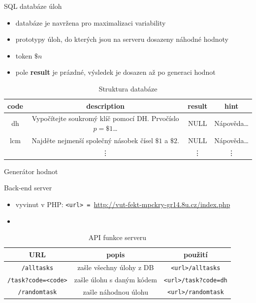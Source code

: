 \documentclass[aspectratio=1610]{beamer}
\begin{document}
\begin{frame}{SQL databáze úloh}
    \begin{itemize}
        \item databáze je navržena pro maximalizaci variability
        \item prototypy úloh, do kterých jsou na serveru dosazeny náhodné hodnoty
        \item token \textbf{$\$n$}
        \item pole \textbf{result} je prázdné, výsledek je dosazen až po generaci hodnot
    \end{itemize}
    \begin{table}
        \caption{Struktura databáze}
        \begin{tabular}[pos]{|c|c|c|c|}
            \hline
            \textbf{code} & \textbf{description} & \textbf{result} & \textbf{hint} \\
            \hline
            \hline
            dh & Vypočítejte soukromý klíč pomocí DH. Prvočíslo $p=\$1$\dots & NULL & Nápověda\dots \\
            \hline
            lcm & Najděte nejmenší společný násobek čísel $\$1$ a $\$2$. & NULL & Nápověda\dots \\
            \hline
            \smash{\vdots} & \vdots & \vdots & \vdots \\
            \hline
        \end{tabular}
    \end{table}
\end{frame}


\begin{frame}{Generátor hodnot}
    
\end{frame}

\begin{frame}{Back-end server}
    \begin{itemize}
        \item vyvinut v PHP: \texttt{<url> = }\url{http://vut-fekt-mpckry-gr14.8u.cz/index.php}
        \item 
    \end{itemize}
    \begin{table}
        \centering
        \caption{API funkce serveru} 
        \begin{tabular}{|c|c|c|}
            \hline
            \textbf{URL} & \textbf{popis} & \textbf{použití} \\
            \hline \hline
            \texttt{/alltasks} & zašle všechny úlohy z DB & \texttt{<url>/alltasks} \\
            \hline
            \texttt{/task?code=<code>} &zašle úlohu s daným kódem & \texttt{<url>/task?code=dh} \\
            \hline
            \texttt{/randomtask} & zašle náhodnou úlohu & \texttt{<url>/randomtask}\\
            \hline
        \end{tabular}
    \end{table}
    
\end{frame}
\end{document}
